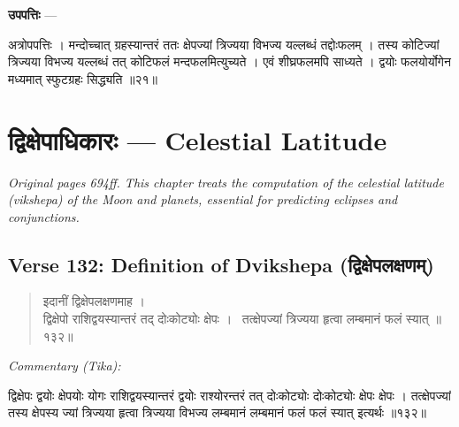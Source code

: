 \documentclass[11pt,a4paper]{article}
\newcommand{\dev}[1]{{\devanagarifont #1}}
\newcommand{\skt}[1]{{\devanagarifont\color{sktcolor} #1}}
\newenvironment{shloka}{%
  \begin{quote}%
  \smallskip%
  \devanagarifont\color{sktcolor}%
}{%
  \smallskip%
  \end{quote}%
}
\newenvironment{tika}{%
  \smallskip%
  \noindent\textit{Commentary (Tika):}\par%
  \smallskip%
  \hindifont\small%
}{%
  \par\smallskip%
}
\newenvironment{upapatti}{%
  \smallskip%
  \noindent\textbf{\devanagarifont उपपत्तिः} — \devanagarifont\small%
}{%
  \par\smallskip%
}
\newcommand{\ednote}[1]{\textcolor{notecolor}{\textit{#1}}}
\begin{document}
\vspace{0.3cm}
\begin{upapatti}
\skt{अत्रोपपत्तिः} । मन्दोच्चात् ग्रहस्यान्तरं ततः क्षेपज्यां त्रिज्यया विभज्य यल्लब्धं तद्दोःफलम् । तस्य कोटिज्यां त्रिज्यया विभज्य यल्लब्धं तत् कोटिफलं मन्दफलमित्युच्यते । एवं शीघ्रफलमपि साध्यते । द्वयोः फलयोर्योगेन मध्यमात् स्फुटग्रहः सिद्ध्यति ॥२१॥
\end{upapatti}

\newpage
\section[द्विक्षेपाधिकारः]{\dev{द्विक्षेपाधिकारः} — Celestial Latitude}
\label{sec:dvikshepa}

\ednote{Original pages 694ff. This chapter treats the computation of the celestial latitude (vikshepa) of the Moon and planets, essential for predicting eclipses and conjunctions.}

\subsection*{Verse 132: Definition of Dvikshepa (\dev{द्विक्षेपलक्षणम्})}

\begin{shloka}
\skt{इदानीं द्विक्षेपलक्षणमाह ।}\\[0.5em]
\skt{द्विक्षेपो राशिद्वयस्यान्तरं तद् दोःकोट्योः क्षेपः ।}\
\skt{तत्क्षेपज्यां त्रिज्यया हृत्वा लम्बमानं फलं स्यात्} ॥१३२॥
\end{shloka}

\vspace{0.3cm}
\begin{tika}
\skt{द्विक्षेपः} द्वयोः क्षेपयोः योगः \skt{राशिद्वयस्यान्तरं} द्वयोः राश्योरन्तरं तत् \skt{दोःकोट्योः} दोःकोट्योः \skt{क्षेपः} क्षेपः । \skt{तत्क्षेपज्यां} तस्य क्षेपस्य ज्यां \skt{त्रिज्यया हृत्वा} त्रिज्यया विभज्य \skt{लम्बमानं} लम्बमानं \skt{फलं} फलं \skt{स्यात्} इत्यर्थः ॥१३२॥
\end{tika}
\end{document}
